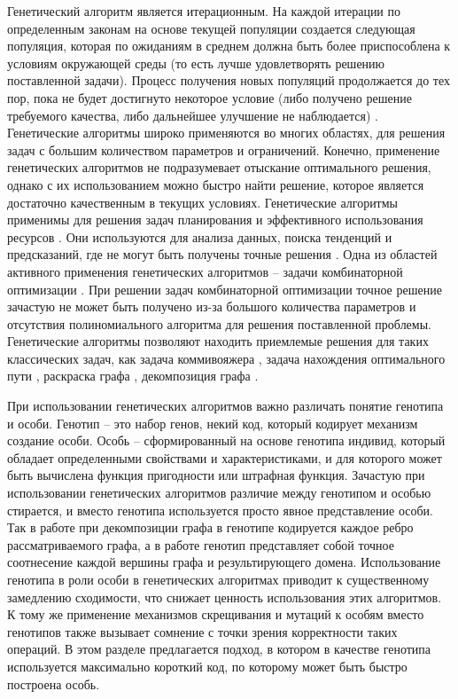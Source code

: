 Генетический алгоритм является итерационным.
На каждой итерации по определенным законам на основе текущей популяции создается следующая популяция\label{term:population}, которая по ожиданиям в среднем должна быть более приспособлена к условиям окружающей среды (то есть лучше удовлетворять решению поставленной задачи).
Процесс получения новых популяций продолжается до тех пор, пока не будет достигнуто некоторое условие (либо получено решение требуемого качества, либо дальнейшее улучшение не наблюдается) \cite{Charilogis2024Gen}.
Генетические алгоритмы широко применяются во многих областях, для решения задач с большим количеством параметров и ограничений.
Конечно, применение генетических алгоритмов не подразумевает отыскание оптимального решения, однако с их использованием можно быстро найти решение, которое является достаточно качественным в текущих условиях.
Генетические алгоритмы применимы для решения задач планирования \cite{Dawei2025Gen} и эффективного использования ресурсов \cite{Fang2025Gen,Mahmood2024Gen}.
Они используются для анализа данных, поиска тенденций и предсказаний, где не могут быть получены точные решения \cite{Kangra2024Gen,Sangeetha2025Gen}.
Одна из областей активного применения генетических алгоритмов – задачи комбинаторной оптимизации \cite{Hamdan2023Comb,Odeyemi2025Comb}.
При решении задач комбинаторной оптимизации точное решение зачастую не может быть получено из-за большого количества параметров и отсутствия полиномиального алгоритма для решения поставленной проблемы.
Генетические алгоритмы позволяют находить приемлемые решения для таких классических задач, как задача коммивояжера \cite{Kralev2024Gen}, задача нахождения оптимального пути \cite{Bogdanov2023Gen}, раскраска графа \cite{Malhotra2024Graph}, декомпозиция графа \cite{Chaouche2023Graph,Li2020Graph}.

При использовании генетических алгоритмов важно различать понятие генотипа и особи.
Генотип – это набор генов, некий код, который кодирует механизм создание особи.
Особь – сформированный на основе генотипа индивид, который обладает определенными свойствами и характеристиками, и для которого может быть вычислена функция пригодности или штрафная функция.
Зачастую при использовании генетических алгоритмов различие между генотипом и особью стирается, и вместо генотипа используется просто явное представление особи.
Так в работе \cite{Chaouche2023Graph} при декомпозиции графа в генотипе кодируется каждое ребро рассматриваемого графа, а в работе \cite{Li2020Graph} генотип представляет собой точное соотнесение каждой вершины графа и результирующего домена.
Использование генотипа в роли особи в генетических алгоритмах приводит к существенному замедлению сходимости, что снижает ценность использования этих алгоритмов.
К тому же применение механизмов скрещивания и мутаций к особям вместо генотипов также вызывает сомнение с точки зрения корректности таких операций.
В этом разделе предлагается подход, в котором в качестве генотипа используется максимально короткий код, по которому может быть быстро построена особь.

